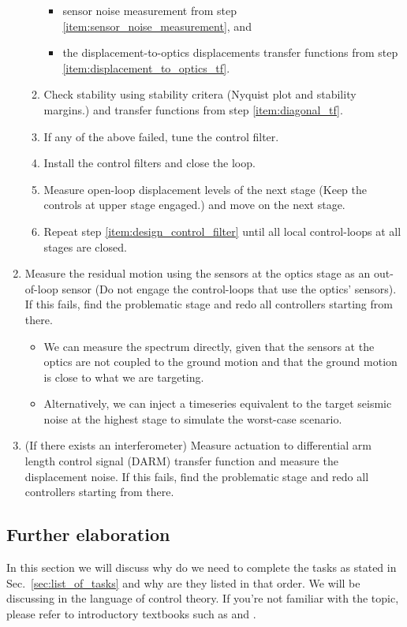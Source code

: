 \begin{enumerate}
\begin{enumerate}
\begin{itemize}
			\item sensor noise measurement from step \ref{item:sensor_noise_measurement}, and
			\item the displacement-to-optics displacements transfer functions from step \ref{item:displacement_to_optics_tf}.
		\end{itemize} 
		\item Check stability using stability critera (Nyquist plot and stability margins.) and transfer functions from step \ref{item:diagonal_tf}.
		\item If any of the above failed, tune the control filter.
		\item Install the control filters and close the loop.
		\item Measure open-loop displacement levels of the next stage (Keep the controls at upper stage engaged.) and move on the next stage. \label{item:open_loop_displacement_levels}
		\item Repeat step \ref{item:design_control_filter} until all local control-loops at all stages are closed.
	\end{enumerate}
	\item Measure the residual motion using the sensors at the optics stage as an out-of-loop sensor (Do not engage the control-loops that use the optics' sensors). If this fails, find the problematic stage and redo all controllers starting from there.
		\begin{itemize}
			\item We can measure the spectrum directly, given that the sensors at the optics are not coupled to the ground motion and that the ground motion is close to what we are targeting.
			\item Alternatively, we can inject a timeseries equivalent to the target seismic noise at the highest stage to simulate the worst-case scenario.
		\end{itemize}
	\item (If there exists an interferometer) Measure actuation to differential arm length control signal (DARM) transfer function and measure the displacement noise. If this fails, find the problematic stage and redo all controllers starting from there.
\end{enumerate}

\subsection{Further elaboration}
In this section we will discuss why do we need to complete the tasks as stated in Sec.~\ref{sec:list_of_tasks} and why are they listed in that order.
We will be discussing in the language of control theory.
If you're not familiar with the topic, please refer to introductory textbooks such as \cite{modern_control_engineering} and \cite{control_engineering}.

